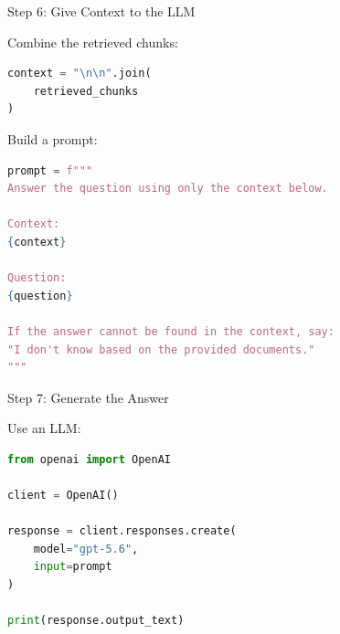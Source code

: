 \documentclass[aspectratio=169]{beamer}
\begin{document}
\begin{frame}[fragile]{Step 6: Give Context to the LLM}

Combine the retrieved chunks:

\begin{lstlisting}[language=Python]
context = "\n\n".join(
    retrieved_chunks
)
\end{lstlisting}

Build a prompt:

\begin{lstlisting}[language=Python]
prompt = f"""
Answer the question using only the context below.

Context:
{context}

Question:
{question}

If the answer cannot be found in the context, say:
"I don't know based on the provided documents."
"""
\end{lstlisting}

\end{frame}

\begin{frame}[fragile]{Step 7: Generate the Answer}

Use an LLM:

\begin{lstlisting}[language=Python]
from openai import OpenAI

client = OpenAI()

response = client.responses.create(
    model="gpt-5.6",
    input=prompt
)

print(response.output_text)
\end{lstlisting}



\end{frame}
\end{document}
